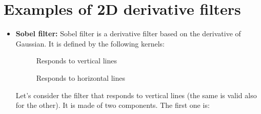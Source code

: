 \section{Examples of 2D derivative filters}
\begin{itemize}
    \item \textbf{Sobel filter:}
    Sobel filter is a derivative filter based on the derivative of Gaussian. It is defined by the following kernels:
    \begin{center}
        \begin{figure}[ht]
        \begin{minipage}{0.45\linewidth}
        \centering
        \caption*{Responds to vertical lines}
        \end{minipage}
        \hspace{20pt}
        \begin{minipage}{0.45\linewidth}
        \centering
        \caption*{Responds to horizontal lines}
        \end{minipage}
    \end{figure}
    \end{center}
    Let's consider the filter that responds to vertical lines (the same is valid also for the other). It is made of two components.\newline \newline
    The first one is:
    \begin{flushleft}
\end{flushleft}
\end{itemize}
